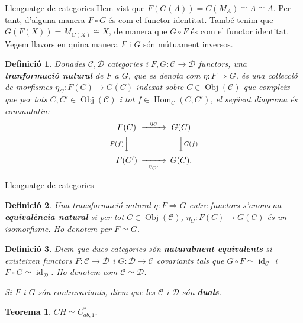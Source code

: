 \documentclass{beamer}
\newtheorem{teorema}{Teorema}
\newtheorem{definicio}{Definici\'{o}}
\theoremstyle{definition}
\DeclareMathOperator{\Obj}{Obj}
\DeclareMathOperator{\Hom}{Hom}
\DeclareMathOperator{\id}{id}
\begin{document}
\begin{frame}{Llenguatge de categories}
Hem vist que $F(G(A))=C(M_A)\cong A\cong A$. Per tant, d'alguna manera $F\circ G$ \'{e}s com el functor identitat. Tamb\'{e} tenim que $G(F(X))=M_{C(X)}\cong X$, de manera que $G\circ F$ \'{e}s com el functor identitat. Vegem llavors en quina manera $F$ i $G$ s\'{o}n m\'{u}tuament inversos.
\pause

\begin{definicio}
Donades $\mathcal{C},\mathcal{D}$ categories i $F,G:\mathcal{C}\rightarrow\mathcal{D}$ functors, una \textbf{tranformaci\'{o} natural} de $F$ a $G$, que es denota com $\eta:F\Rightarrow G$, \'{e}s una col\textperiodcentered lecci\'{o} de morfismes $\eta_C:F(C)\rightarrow G(C)$ indexat sobre $C\in\Obj(\mathcal{C})$ que compleix que per tots $C,C'\in\Obj(\mathcal{C})$ i tot $f\in\Hom_{\mathcal{C}}(C,C')$, el seg\"{u}ent diagrama \'{e}s commutatiu:
\[\begin{CD}F(C)@>\eta_C>>G(C)\\@VF(f)VV@VVG(f)V\\F(C')@>>\eta_{C'}>G(C).\end{CD}\]
\end{definicio}
\end{frame}

\begin{frame}{Llenguatge de categories}
\begin{definicio}
Una transformaci\'{o} natural $\eta:F\Rightarrow G$ entre functors s'anomena \textbf{equival\`{e}ncia natural} si per tot $C\in\Obj(\mathcal{C})$, $\eta_C:F(C)\rightarrow G(C)$ \'{e}s un isomorfisme. Ho denotem per $F\simeq G$.
\end{definicio}
\pause

\begin{definicio}
Diem que dues categories s\'{o}n \textbf{naturalment equivalents} si existeixen functors $F:\mathcal{C}\rightarrow\mathcal{D}$ i $G:\mathcal{D}\rightarrow\mathcal{C}$ covariants tals que $G\circ F\simeq\id_{\mathcal{C}}$ i $F\circ G\simeq\id_{\mathcal{D}}$. Ho denotem com $\mathcal{C}\simeq\mathcal{D}$.

Si $F$ i $G$ s\'{o}n contravariants, diem que les $\mathcal{C}$ i $\mathcal{D}$ s\'{o}n \textbf{duals}.
\end{definicio}
\begin{teorema}
$CH\simeq C_{ab,1}^*$.
\end{teorema}
\end{frame}
\end{document}
